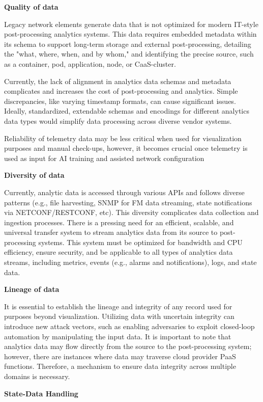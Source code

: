 \documentclass[11pt,sigconf]{iabart}
\begin{document}
\textbf{Quality of data} 

Legacy network elements generate data that is not optimized for modern IT-style post-processing analytics systems. This data requires embedded metadata within its schema to support long-term storage and external post-processing, detailing the "what, where, when, and by whom," and identifying the precise source, such as a container, pod, application, node, or CaaS-cluster.

Currently, the lack of alignment in analytics data schemas and metadata complicates and increases the cost of post-processing and analytics. Simple discrepancies, like varying timestamp formats, can cause significant issues. Ideally, standardized, extendable schemas and encodings for different analytics data types would simplify data processing across diverse vendor systems.

Reliability of telemetry data may be less critical when used for visualization purposes and manual check-ups, however, it becomes crucial once telemetry is used as input for AI training and assisted network configuration

\textbf{Diversity of data} 

Currently, analytic data is accessed through various APIs and follows diverse patterns (e.g., file harvesting, SNMP for FM data streaming, state notifications via NETCONF/RESTCONF, etc). This diversity complicates data collection and ingestion processes. There is a pressing need for an efficient, scalable, and universal transfer system to stream analytics data from its source to post-processing systems. This system must be optimized for bandwidth and CPU efficiency, ensure security, and be applicable to all types of analytics data streams, including metrics, events (e.g., alarms and notifications), logs, and state data.

\textbf{Lineage of data}

It is essential to establish the lineage and integrity of any record used for purposes beyond visualization. Utilizing data with uncertain integrity can introduce new attack vectors, such as enabling adversaries to exploit closed-loop automation by manipulating the input data. It is important to note that analytics data may flow directly from the source to the post-processing system; however, there are instances where data may traverse cloud provider PaaS functions. Therefore, a mechanism to ensure data integrity across multiple domains is necessary.

\textbf{State-Data Handling}
\end{document}
